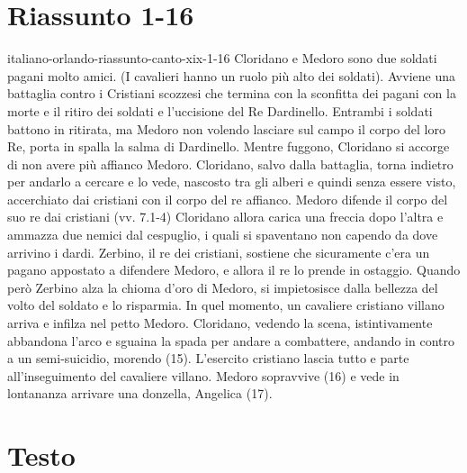 \documentclass[preview]{standalone}
\begin{document}
\genpage

\section{Riassunto 1-16}

\begin{snippet}{italiano-orlando-riassunto-canto-xix-1-16}
    Cloridano e Medoro sono due soldati pagani molto amici. (I cavalieri hanno un ruolo più alto dei soldati).
    Avviene una battaglia contro i Cristiani scozzesi che termina con la sconfitta dei pagani con la morte e il ritiro dei soldati e l'uccisione del Re Dardinello.
    Entrambi i soldati battono in ritirata, ma Medoro non volendo lasciare sul campo il corpo del loro Re, porta in spalla la salma di Dardinello.
    Mentre fuggono, Cloridano si accorge di non avere più affianco Medoro.
    Cloridano, salvo dalla battaglia, torna indietro per andarlo a cercare e lo vede, nascosto tra gli alberi e quindi senza essere visto, accerchiato dai cristiani con il corpo del re affianco.
    Medoro difende il corpo del suo re dai cristiani  (vv. 7.1-4)
    Cloridano allora carica una freccia dopo l'altra e ammazza due nemici dal cespuglio, i quali si spaventano non capendo da dove arrivino i dardi.
    Zerbino, il re dei cristiani, sostiene che sicuramente c'era un pagano appostato a difendere Medoro, e allora il re lo prende in ostaggio.
    Quando però Zerbino alza la chioma d'oro di Medoro, si impietosisce dalla bellezza del volto del soldato e lo risparmia.
    In quel momento, un cavaliere cristiano villano arriva e infilza nel petto Medoro.
    Cloridano, vedendo la scena, istintivamente abbandona l'arco e sguaina la spada per andare a combattere, andando in contro a un semi-suicidio, morendo (15).
    L'esercito cristiano lascia tutto e parte all'inseguimento del cavaliere villano.
    Medoro sopravvive (16) e vede in lontananza arrivare una donzella, Angelica (17).
\end{snippet}

\section{Testo}
\end{document}
